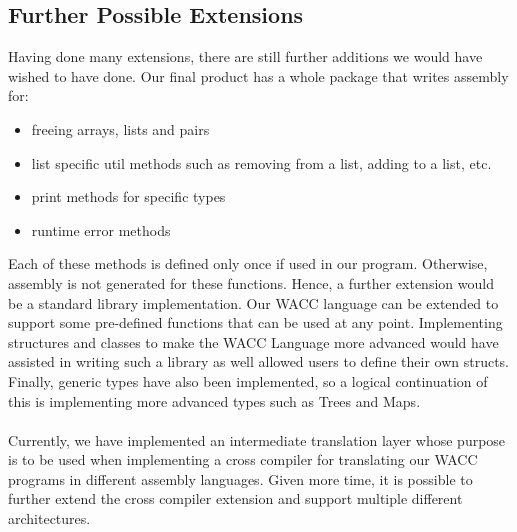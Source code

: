 \documentclass[5pt]{article}
\begin{document}
\subsection{Further Possible Extensions}
Having done many extensions, there are still further additions we would have wished to have done. Our final product has a whole package that writes assembly for:
\begin{itemize}
    \itemsep-0.1em
    \item {freeing arrays, lists and pairs}
    \item {list specific util methods such as removing from a list, adding to a list, etc.}
    \item {print methods for specific types}
    \item {runtime error methods}
\end{itemize}
Each of these methods is defined only once if used in our program. Otherwise, assembly is not generated for these functions. Hence, a further extension would be a standard library implementation. Our WACC language can be extended to support some pre-defined functions that can be used at any point. Implementing structures and classes to make the WACC Language more advanced would have assisted in writing such a library as well allowed users to define their own structs. Finally, generic types have also been implemented, so a logical continuation of this is implementing more advanced types such as Trees and Maps.
\\ \\
Currently, we have implemented an intermediate translation layer whose purpose is to be used when implementing a cross compiler for translating our WACC programs in different assembly languages. Given more time, it is possible to further extend the cross compiler extension and support multiple different architectures.
\end{document}
